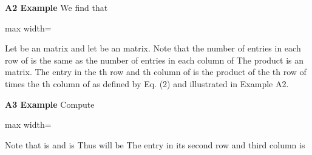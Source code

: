 \documentclass[11pt,oneside]{article}
\begin{document}
\begin{BookBody}

\noindent \textbf{A2 Example} We find that

\begin{center}\begin{adjustbox}{max width=\linewidth}\end{adjustbox}\end{center} \BookEnd{\blacktriangle}

Let  be an  matrix and let  be an  matrix. Note that the number  of entries in each row of  is the same as the number  of entries in each column of  The product  is an  matrix. The entry in the th row and th column of  is the product of the th row of  times the th column of  as defined by Eq. (2) and illustrated in Example A2.

\noindent \textbf{A3 Example} Compute

\begin{center}\begin{adjustbox}{max width=\linewidth}\end{adjustbox}\end{center}

 Note that  is  and  is  Thus  will be  The entry in its second row and third column is


\end{BookBody}
\end{document}
